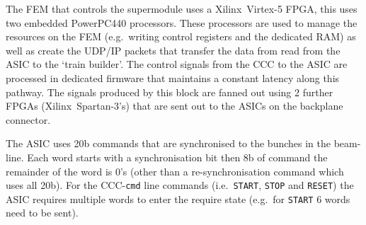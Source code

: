 The FEM that controls the supermodule uses a Xilinx~Virtex-5 FPGA, this uses two embedded PowerPC440 processors. These processors are used to manage the resources on the FEM (e.g.\ writing control registers and the dedicated RAM) as well as create the UDP/IP packets that transfer the data from read from the ASIC to the `train builder'. The control signals from the CCC to the ASIC are processed in dedicated firmware that maintains a constant latency along this pathway. The signals produced by this block are fanned out using 2 further FPGAs (Xilinx~Spartan-3's) that are sent out to the ASICs on the backplane connector.
    
The ASIC uses 20b commands that are synchronised to the bunches in the beam-line. Each word starts with a synchronisation bit then 8b of command the remainder of the word is 0's (other than a re-synchronisation command which uses all 20b). For the CCC-\texttt{cmd} line commands (i.e.\ \texttt{START}, \texttt{STOP} and \texttt{RESET}) the ASIC requires multiple words to enter the require state (e.g.\ for \texttt{START} 6 words need to be sent).
% 
    
    
    
    
    
